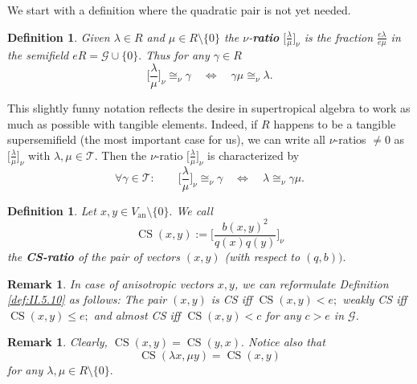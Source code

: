 \documentclass [12pt,a4paper,reqno]{amsart}
\newtheorem{remark}[thm]{Remark}
\newtheorem{defn}[thm]{Definition}
\begin{document}
We start with a definition where the quadratic pair is not yet
needed.

\begin{defn}\label{defn:II.6.1}
Given ${\lambda}\in R$ and $\mu\in R{\setminus}\{0\}$ the
$\nu$-{\textbf{{ratio}}} $\big[\frac{\lambda}{\mu}\big]_\nu$ is the
fraction $\frac{e{\lambda}}{e\mu}$ in the semifield $eR={\mathcal G} \cup\{0\}.$ Thus for any $\gamma\in R$
\begin{equation}\label{eq:II.6.3}
\bigg[\frac{\lambda}{\mu}\bigg]_\nu\cong_\nu\gamma
{\quad {\Leftrightarrow} \quad }\gamma\mu\cong_\nu{\lambda}.
\end{equation}
\end{defn}

This slightly funny notation reflects the desire in supertropical
algebra to work as much as possible with tangible elements.
Indeed, if $R$ happens to be a tangible supersemifield (the most
important case for us), we can write all $\nu$-ratios $\ne0$ as
$\big[\frac{\lambda}{\mu}\big]_\nu$ with ${\lambda},\mu\in {\mathcal T}.$ Then  the $\nu$-ratio $\big[\frac{\lambda}{\mu}\big]_\nu$ is characterized by
\begin{equation}\label{eq:II.6.4} \forall {\gamma} \in {\mathcal T}: \qquad
\bigg[\frac{\lambda}{\mu}\bigg]_\nu\cong_\nu\gamma {\quad {\Leftrightarrow} \quad }{\lambda}\cong_\nu\gamma\mu.
\end{equation}

\begin{defn}\label{defn:II.6.2}
Let $x,y\in V_{\operatorname{an}} {\setminus} \{ 0 \}.$ We call
$${\operatorname{CS}}(x,y):=\bigg[\frac{b(x,y)^2}{q(x)q(y)}\bigg]_\nu$$
the {\textbf{{CS-ratio}}} of the pair of vectors $(x,y)$ (with respect
to $(q,b)).$\end{defn}

\begin{remark}\label{rem:II.6.3}
In case of anisotropic vectors $x,y$, we can  reformulate Definition
\ref{def:II.5.10} as follows: The pair $(x,y)$ is CS iff
${\operatorname{CS}}(x,y)< e;$ weakly
 CS iff ${\operatorname{CS}}(x,y)\le e;$ and almost CS iff ${\operatorname{CS}}(x,y)<c$ for any
 $c>e$ in ${\mathcal G}.$\end{remark}

\begin{remark}\label{rem:II.6.4}
Clearly, ${\operatorname{CS}}(x,y)={\operatorname{CS}}(y,x).$ Notice also that
\begin{equation}\label{eq:II.6.6}
{\operatorname{CS}}({\lambda} x,\mu y)={\operatorname{CS}}(x,y)\end{equation} for any ${\lambda},\mu\in
R{\setminus}\{0\}.$
\end{remark}
\end{document}
